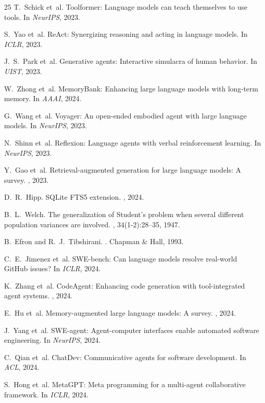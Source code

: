 \documentclass{article}
\begin{document}
\begin{thebibliography}{25}
T.~Schick et~al.
\newblock Toolformer: Language models can teach themselves to use tools.
\newblock In {\em NeurIPS}, 2023.

S.~Yao et~al.
\newblock ReAct: Synergizing reasoning and acting in language models.
\newblock In {\em ICLR}, 2023.

J.~S.~Park et~al.
\newblock Generative agents: Interactive simulacra of human behavior.
\newblock In {\em UIST}, 2023.

W.~Zhong et~al.
\newblock MemoryBank: Enhancing large language models with long-term memory.
\newblock In {\em AAAI}, 2024.

G.~Wang et~al.
\newblock Voyager: An open-ended embodied agent with large language models.
\newblock In {\em NeurIPS}, 2023.

N.~Shinn et~al.
\newblock Reflexion: Language agents with verbal reinforcement learning.
\newblock In {\em NeurIPS}, 2023.

Y.~Gao et~al.
\newblock Retrieval-augmented generation for large language models: A survey.
, 2023.

D.~R.~Hipp.
\newblock SQLite FTS5 extension.
, 2024.

B.~L.~Welch.
\newblock The generalization of Student's problem when several different population variances are involved.
, 34(1-2):28--35, 1947.

B.~Efron and R.~J.~Tibshirani.
.
\newblock Chapman \& Hall, 1993.

C.~E.~Jimenez et~al.
\newblock SWE-bench: Can language models resolve real-world GitHub issues?
\newblock In {\em ICLR}, 2024.

K.~Zhang et~al.
\newblock CodeAgent: Enhancing code generation with tool-integrated agent systems.
, 2024.

E.~Hu et~al.
\newblock Memory-augmented large language models: A survey.
, 2024.

J.~Yang et~al.
\newblock SWE-agent: Agent-computer interfaces enable automated software engineering.
\newblock In {\em NeurIPS}, 2024.

C.~Qian et~al.
\newblock ChatDev: Communicative agents for software development.
\newblock In {\em ACL}, 2024.

S.~Hong et~al.
\newblock MetaGPT: Meta programming for a multi-agent collaborative framework.
\newblock In {\em ICLR}, 2024.

\end{thebibliography}
\end{document}
